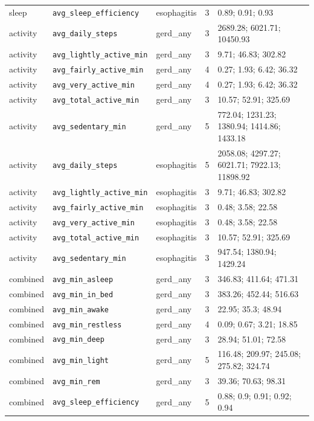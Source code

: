 \documentclass[11pt]{article}
\newcommand{\code}[1]{\texttt{\small #1}}
\begin{document}
\begin{longtable}{@{}p{1.7cm}p{3.2cm}p{2.0cm}c p{5.4cm}@{}}
sleep & \code{avg\_sleep\_efficiency} & esophagitis & 3 & 0.89; 0.91; 0.93 \\
activity & \code{avg\_daily\_steps} & gerd\_any & 3 & 2689.28; 6021.71; 10450.93 \\
activity & \code{avg\_lightly\_active\_min} & gerd\_any & 3 & 9.71; 46.83; 302.82 \\
activity & \code{avg\_fairly\_active\_min} & gerd\_any & 4 & 0.27; 1.93; 6.42; 36.32 \\
activity & \code{avg\_very\_active\_min} & gerd\_any & 4 & 0.27; 1.93; 6.42; 36.32 \\
activity & \code{avg\_total\_active\_min} & gerd\_any & 3 & 10.57; 52.91; 325.69 \\
activity & \code{avg\_sedentary\_min} & gerd\_any & 5 & 772.04; 1231.23; 1380.94; 1414.86; 1433.18 \\
activity & \code{avg\_daily\_steps} & esophagitis & 5 & 2058.08; 4297.27; 6021.71; 7922.13; 11898.92 \\
activity & \code{avg\_lightly\_active\_min} & esophagitis & 3 & 9.71; 46.83; 302.82 \\
activity & \code{avg\_fairly\_active\_min} & esophagitis & 3 & 0.48; 3.58; 22.58 \\
activity & \code{avg\_very\_active\_min} & esophagitis & 3 & 0.48; 3.58; 22.58 \\
activity & \code{avg\_total\_active\_min} & esophagitis & 3 & 10.57; 52.91; 325.69 \\
activity & \code{avg\_sedentary\_min} & esophagitis & 3 & 947.54; 1380.94; 1429.24 \\
combined & \code{avg\_min\_asleep} & gerd\_any & 3 & 346.83; 411.64; 471.31 \\
combined & \code{avg\_min\_in\_bed} & gerd\_any & 3 & 383.26; 452.44; 516.63 \\
combined & \code{avg\_min\_awake} & gerd\_any & 3 & 22.95; 35.3; 48.94 \\
combined & \code{avg\_min\_restless} & gerd\_any & 4 & 0.09; 0.67; 3.21; 18.85 \\
combined & \code{avg\_min\_deep} & gerd\_any & 3 & 28.94; 51.01; 72.58 \\
combined & \code{avg\_min\_light} & gerd\_any & 5 & 116.48; 209.97; 245.08; 275.82; 324.74 \\
combined & \code{avg\_min\_rem} & gerd\_any & 3 & 39.36; 70.63; 98.31 \\
combined & \code{avg\_sleep\_efficiency} & gerd\_any & 5 & 0.88; 0.9; 0.91; 0.92; 0.94 \\

\end{longtable}
\end{document}
